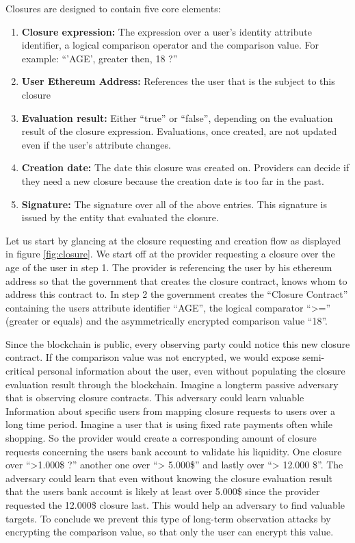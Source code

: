\noindent Closures are designed to contain five core elements:
\begin{enumerate}
\item \textbf{Closure expression:} The expression over a user’s identity attribute identifier, a logical comparison operator and the comparison value. For example: “’AGE’, greater then, 18 ?”
\item \textbf{User Ethereum Address:} References the user that is the subject to this closure
\item \textbf{Evaluation result:} Either “true” or “false”, depending on the evaluation result of the closure expression. Evaluations, once created, are not updated even if the user’s attribute changes.
\item \textbf{Creation date:} The date this closure was created on. Providers can decide if they need a new closure because the creation date is too far in the past. 
\item \textbf{Signature:} The signature over all of the above entries. This signature is issued by the entity that evaluated the closure.
\end{enumerate}

Let us start by glancing at the closure requesting and creation flow as displayed in figure \ref{fig:closure}. We start off at the provider requesting a closure over the age of the user in step 1. 
The provider is referencing the user by his ethereum address so that the government that creates the closure contract, knows whom to address this contract to. In step 2 the government creates the “Closure Contract” containing the users attribute identifier “AGE”, the logical comparator “>=” (greater or equals) and the asymmetrically encrypted comparison value “18”.  

Since the blockchain is public, every observing party could notice this new closure contract. If the comparison value was not encrypted, we would expose semi-critical personal information about the user, even without populating the closure evaluation result through the blockchain. Imagine a longterm passive adversary that is observing closure contracts. This adversary could learn valuable Information about specific users from mapping closure requests to users over a long time period. Imagine a user that is using fixed rate payments often while shopping. So the provider would create a corresponding amount of closure requests concerning the users bank account to validate his liquidity. One closure over “>1.000\$ ?”  another one over “> 5.000\$” and lastly over “> 12.000 \$”. The adversary could learn that even without knowing the closure evaluation result that the users bank account is likely at least over 5.000\$ since the provider requested the 12.000\$ closure last. This would help an adversary to find valuable targets. 
To conclude we prevent this type of long-term observation attacks by encrypting the comparison value, so that only the user can encrypt this value. 


